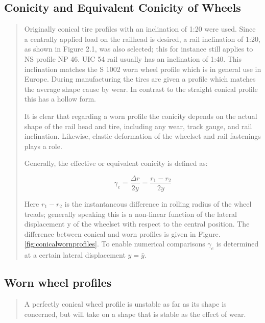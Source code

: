 \begin{appendices}
\begin{quote}
\end{quote}

\subsection{Conicity and Equivalent Conicity of Wheels}

\begin{quote}

Originally conical tire profiles with an inclination of 1:20 were used. Since a centrally applied load on the railhead is desired, a rail inclination of 1:20, as shown in Figure 2.1, was also selected; this for instance still applies to NS profile NP 46. UIC 54 rail usually has an inclination of 1:40. This inclination matches the S 1002 worn wheel profile which is in general use in Europe. During manufacturing the tires are given a profile which matches the average shape cause by wear. In contrast to the straight conical profile this has a hollow form.

It is clear that regarding a worn profile the conicity depends on the actual shape of the rail head and tire, including any wear, track gauge, and rail inclination. Likewise, elastic deformation of the wheelset and rail fastenings plays a role.

Generally, the effective or equivalent conicity is defined as:

$$ \gamma_e = \frac{\Delta r}{2y} = \frac{r_1 - r_2}{2y}  $$

Here $r_1 - r_2$ is the instantaneous difference in rolling radius of the wheel treads; generally speaking this is a non-linear function of the lateral displacement y of the wheelset with respect to the central position. The difference between conical and worn profiles is given in Figure.\ref{fig:conicalwornprofiles}. To enable numerical comparisons $\gamma_e$ is determined at a certain lateral displacement $y=\bar{y}$.

\end{quote}

\subsection{Worn wheel profiles}

\begin{quote}

A perfectly conical wheel profile is unstable as far as its shape is concerned, but will take on a shape that is stable as the effect of wear.


\end{quote}
\end{appendices}
